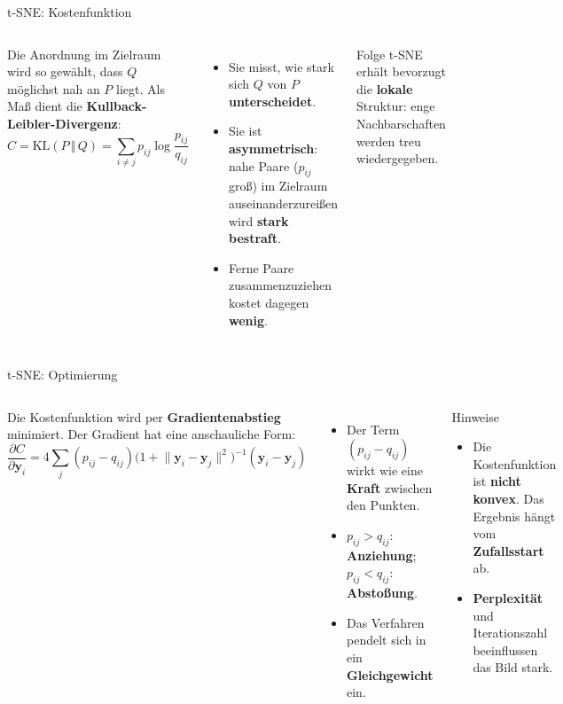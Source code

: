 \begin{frame}{t-SNE: Kostenfunktion}
\footnotesize
\begin{columns}
Die Anordnung im Zielraum wird so gewählt, dass $Q$ möglichst nah an $P$
liegt. Als Maß dient die \textbf{Kullback-Leibler-Divergenz}:
\[
  C = \mathrm{KL}(P \,\Vert\, Q)
    = \sum_{i \neq j} p_{ij} \log \frac{p_{ij}}{q_{ij}}
\]

\begin{itemize}
  \item Sie misst, wie stark sich $Q$ von $P$ \textbf{unterscheidet}.
  \item Sie ist \textbf{asymmetrisch}: nahe Paare ($p_{ij}$ groß) im Zielraum
        auseinanderzureißen wird \textbf{stark bestraft}.
  \item Ferne Paare zusammenzuziehen kostet dagegen \textbf{wenig}.
\end{itemize}

\begin{blockC1}{\footnotesize Folge}
t-SNE erhält bevorzugt die \textbf{lokale} Struktur: enge Nachbarschaften
werden treu wiedergegeben.
\end{blockC1}
\end{columns}
\end{frame}

\begin{frame}{t-SNE: Optimierung}
\footnotesize
\begin{columns}
Die Kostenfunktion wird per \textbf{Gradientenabstieg} minimiert. Der
Gradient hat eine anschauliche Form:
\[
  \frac{\partial C}{\partial \mathbf{y}_i}
  = 4 \sum_{j} (p_{ij} - q_{ij})
    \bigl(1 + \lVert \mathbf{y}_i - \mathbf{y}_j \rVert^2\bigr)^{-1}
    (\mathbf{y}_i - \mathbf{y}_j)
\]

\begin{itemize}
  \item Der Term $(p_{ij} - q_{ij})$ wirkt wie eine \textbf{Kraft} zwischen
        den Punkten.
  \item $p_{ij} > q_{ij}$: \textbf{Anziehung}; $p_{ij} < q_{ij}$:
        \textbf{Abstoßung}.
  \item Das Verfahren pendelt sich in ein \textbf{Gleichgewicht} ein.
\end{itemize}

\begin{blockC2}{Hinweise}
\begin{itemize}
  \item Die Kostenfunktion ist \textbf{nicht konvex}. Das Ergebnis hängt
        vom \textbf{Zufallsstart} ab.
  \item \textbf{Perplexität} und Iterationszahl beeinflussen das Bild stark.
\end{itemize}
\end{blockC2}
\end{columns}
\end{frame}

